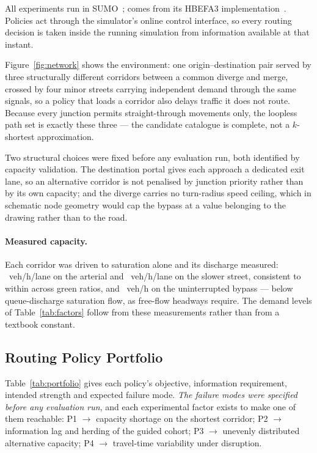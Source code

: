 All experiments run in SUMO~\cite{lopez2018sumo}; \CO{} comes from its HBEFA3
implementation~\cite{krajzewicz2015emissions}. Policies act through the
simulator's online control interface, so every routing decision is taken inside
the running simulation from information available at that instant.

Figure~\ref{fig:network} shows the environment: one origin--destination pair
served by three structurally different corridors between a common diverge and
merge, crossed by four minor streets carrying independent demand through the
same signals, so a policy that loads a corridor also delays traffic it does not
route. Because every junction permits straight-through movements only, the
loopless path set is exactly these three --- the candidate catalogue is
complete, not a $k$-shortest approximation.

Two structural choices were fixed before any evaluation run, both identified by
capacity validation. The destination portal gives each approach a dedicated
exit lane, so an alternative corridor is not penalised by junction priority
rather than by its own capacity; and the diverge carries no turn-radius speed
ceiling, which in schematic node geometry would cap the bypass at a value
belonging to the drawing rather than to the road.

\paragraph{Measured capacity.} Each corridor was driven to saturation alone and
its discharge measured: \NumSatArterial~veh/h/lane on the arterial and
\NumSatNorth~veh/h/lane on the slower street, consistent to within
\NumSatSpread{} across green ratios, and \NumCapBypass~veh/h on the
uninterrupted bypass --- below queue-discharge saturation flow, as free-flow
headways require. The demand levels of Table~\ref{tab:factors} follow from these
measurements rather than from a textbook constant.

\subsection{Routing Policy Portfolio}

Table~\ref{tab:portfolio} gives each policy's objective, information
requirement, intended strength and expected failure mode. \emph{The failure
modes were specified before any evaluation run}, and each experimental factor
exists to make one of them reachable: P1 $\rightarrow$ capacity shortage on the
shortest corridor; P2 $\rightarrow$ information lag and herding of the guided
cohort; P3 $\rightarrow$ unevenly distributed alternative capacity;
P4 $\rightarrow$ travel-time variability under disruption.

